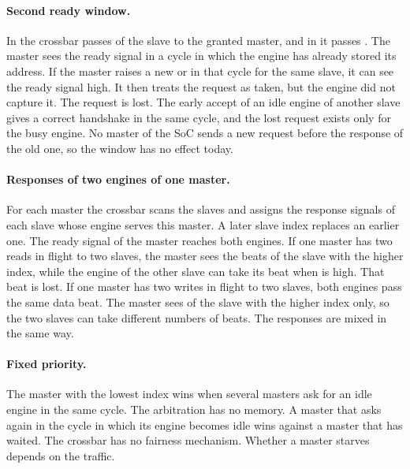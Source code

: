 \paragraph{Second ready window.} In  the crossbar passes  of the slave to the granted master, and in  it passes . The master sees the ready signal in a cycle in which the engine has already stored its address. If the master raises a new  or  in that cycle for the same slave, it can see the ready signal high. It then treats the request as taken, but the engine did not capture it. The request is lost. The early accept of an idle engine of another slave gives a correct handshake in the same cycle, and the lost request exists only for the busy engine. No master of the SoC sends a new request before the response of the old one, so the window has no effect today.

\paragraph{Responses of two engines of one master.} For each master the crossbar scans the slaves and assigns the response signals of each slave whose engine serves this master. A later slave index replaces an earlier one. The ready signal of the master reaches both engines. If one master has two reads in flight to two slaves, the master sees the beats of the slave with the higher index, while the engine of the other slave can take its beat when  is high. That beat is lost. If one master has two writes in flight to two slaves, both engines pass the same data beat. The master sees  of the slave with the higher index only, so the two slaves can take different numbers of beats. The responses are mixed in the same way.

\paragraph{Fixed priority.} The master with the lowest index wins when several masters ask for an idle engine in the same cycle. The arbitration has no memory. A master that asks again in the cycle in which its engine becomes idle wins against a master that has waited. The crossbar has no fairness mechanism. Whether a master starves depends on the traffic.

